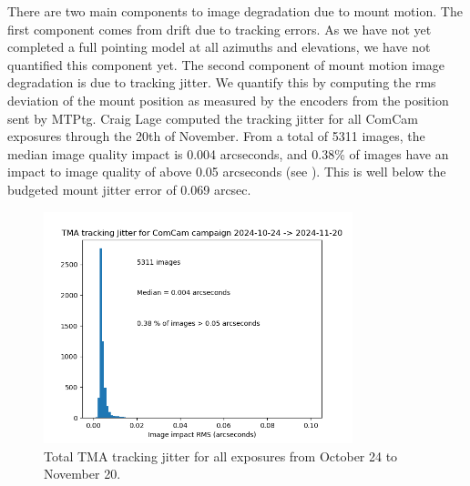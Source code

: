 There are two main components to image degradation due to mount motion. The first component comes from drift due to tracking errors. As we have not yet completed a full pointing model at all azimuths and elevations, we have not quantified this component yet. The second component of mount motion image degradation is due to tracking jitter. We quantify this by computing the rms deviation of the mount position as measured by the encoders from the position sent by MTPtg. Craig Lage computed the tracking jitter for all ComCam exposures through the 20th of November. From a total of 5311 images, the median image quality impact is 0.004 arcseconds, and 0.38\% of images have an impact to image quality of above 0.05 arcseconds (see ). This is well below the budgeted mount jitter error of 0.069 arcsec.

\begin{figure}
  \begin{center}
    \includegraphics[width=0.8\textwidth]{image_quality_figures/ComCam_Mount_Jitter_21Nov24.png}
  \end{center}
  \caption{Total TMA tracking jitter for all exposures from October 24 to November 20.}
  \label{fig:jitter}
\end{figure}

